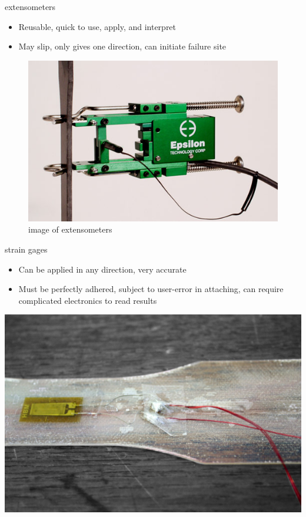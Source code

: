 \documentclass[
  letterpaper,
  ignorenonframetext,
  aspectratio=43,
  handout,
  12pt]{beamer}
\providecommand{\tightlist}{%
  \setlength{\itemsep}{0pt}\setlength{\parskip}{0pt}}
\providecommand{\tightlist}{%
\setlength{\itemsep}{0pt}\setlength{\parskip}{0pt}}
\let\Oldincludegraphics\includegraphics
\renewcommand{\includegraphics}[2][]{\Oldincludegraphics[width=\textwidth,height=0.7\textheight,keepaspectratio]{#2}}
\begin{document}
\begin{frame}{extensometers}
\protect\hypertarget{extensometers}{}
\begin{itemize}
\tightlist
\item
  Reusable, quick to use, apply, and interpret
\item
  May slip, only gives one direction, can initiate failure site
\end{itemize}

\begin{figure}
\centering
\includegraphics{../images/extensometer.jpg}
\caption{image of extensometers}
\end{figure}
\end{frame}

\begin{frame}{strain gages}
\protect\hypertarget{strain-gages}{}
\begin{itemize}
\tightlist
\item
  Can be applied in any direction, very accurate
\item
  Must be perfectly adhered, subject to user-error in attaching, can
  require complicated electronics to read results
\end{itemize}

\includegraphics{../images/strain-gauge-on-specimen-.jpeg}
\end{frame}
\end{document}
